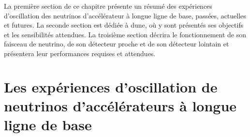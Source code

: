  La première section de ce chapitre présente un résumé des expériences d'oscillation des neutrinos d'accélérateur à longue ligne de base, passées, actuelles et futures. La seconde section est dédiée à \gls{dune}, où y sont présentés ses objectifs et les sensibilités attendues. La troisième section décrira le fonctionnement de son faisceau de neutrino, de son détecteur proche et de son détecteur lointain et présentera leur performances requises et attendues.

  \section{Les expériences d'oscillation de neutrinos d'accélérateurs à longue ligne de base}

%    
%    
